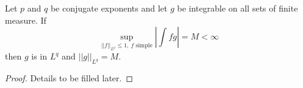 \begin{lemma}
    \label{lem:lp_of_sup_norm}
    \uses{}
    \lean{}
    Let $p$ and $q$ be conjugate exponents and let $g$ be integrable on all sets of finite measure. If
    \[ \sup_{||f||_{L^p} \leq 1, \ f \text{ simple}} \left| \int fg \right| = M < \infty \]
    then $g$ is in $L^q$ and $||g||_{L^q} = M$.
    \end{lemma}
      \begin{proof}
      Details to be filled later.

      \begin{comment}
      (Note: This is used by Stein-Shakarchi to prove the dual of $L^p$ is $L^q$, so it may be already formalized by the time
      we get to this point?)\\\\
      Approximate $g$ by simple functions from below, i.e. consider a sequence $\{g_n\}_{n\in \bbn}$ of simple functions
      such that for each $x$ we have $|g_n (x)| \leq |g(x)|$ and the $g_n$ converge to $g$ pointwise.\\
      If $p>1$ (thus $q<\infty$), consider
      \[ f_n(x) = |g_n(x)|^{q-1} \mathrm{sign}(g(x)) \cdot \frac{1}{||g_n||^{q-1}_{L^q}} \]
      Observe that $||f_n||_{L^p}=1$. For this, first note that $p(q-1)=q$ since
      \[\frac{1}{p} = 1- \frac{1}{q}=\frac{q-1}{q} \ \Rightarrow \ q = p(q-1)  \]
      and then write
      \[||f_n||^p_{L^p} = \int \left|\frac{1}{||g_n||_{L^q}^{q-1}} \cdot |g_n(x)|^{q-1} \mathrm{sign} g(x) \right|^p = \frac{1}{||g_n||_{L^q}^{p(q-1)}} \int  |g_n(x)|^{p(q-1)} = \frac{1}{||g_n||_{L^q}^q} ||g_n||_{L^q}^q = 1  \]
      So by assumption
      \[ \left|\int f_n g\right| \leq M \]
      And by direct computation
      \[ \int f_n g = \int \]

      HOLE HERE
      Then, we conclude by Fatou's Lemma

      If $p=1$, since the measure is $\sigma$-finite, write $X$ as an increasing union of subsets $\{E_n\}$ and take
      \[ f_n (x) = \frac{1}{\mu(E_n)} \mathrm{sign}(g(x)) \chi_{E_n} (x) \]
      Then $||f_n(x)||_{L^1} = \frac{1}{\mu(E_n)} \cdot \mu(E_n) = 1$.


      Now, it is easy to show for both cases that $||g||\geq M$ by H\"older's inequality: since $M$ is the supremum of the absolute value of $\int fg$ for our possible $f$,
      fix an $\epsilon>0$ and choose an $f$ such that
      \[\left| \int fg \right| \geq M-\epsilon \]
      so that
      \[ M- \epsilon \leq ||fg||_{L^1} \leq ||f||_{L^p} ||g||_{L^q} \leq ||g||_{L^q} \]
      Since $\epsilon$ is arbitrarily small, this gives
      \[ ||g||_{L^q} \geq M \]

      \end{comment}

  \end{proof}

